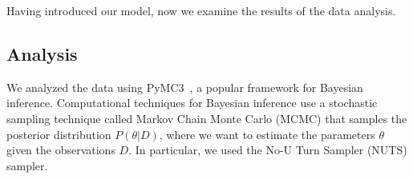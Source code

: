 Having introduced our model, now we examine the results of the data analysis.












\subsection{Analysis}
\label{sub:Analysis}

We analyzed the data using PyMC3~\cite{Salvatier2016}, a popular framework for Bayesian inference. Computational techniques for Bayesian inference use a stochastic sampling technique called Markov Chain Monte Carlo (MCMC) that samples the posterior distribution $P(\theta | D)$, where we want to estimate the parameters $\theta$ given the observations $D$. In particular, we used the No-U Turn Sampler (NUTS) sampler. 

